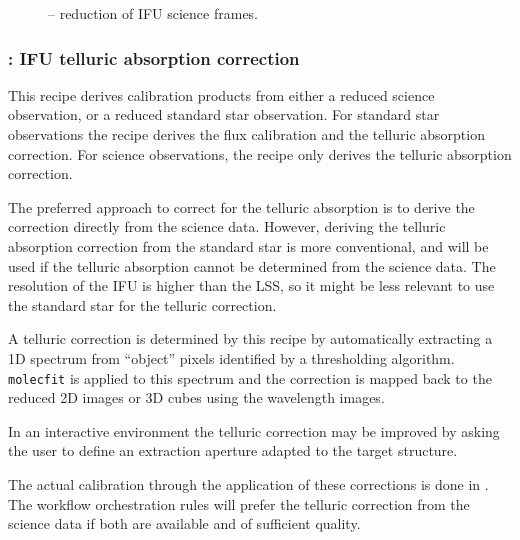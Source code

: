 \begin{figure}[hb]
  \centering
    \def \globalscale {0.700000}
    \fontsize{10}{12}\selectfont
    
  \caption[Recipe: ]{%
     -- reduction of IFU science frames.}
  \label{fig:metis_ifu_reduce}
\end{figure}
\restoregeometry

\clearpage
\subsubsection{: IFU telluric absorption correction}
\label{sssec:ifu_telluric}
\label{rec:metis_ifu_telluric}

This recipe derives calibration products from either a reduced science
observation, or a reduced standard star observation.
For standard star observations the recipe derives the flux calibration and the
telluric absorption correction.
For science observations, the recipe only derives the telluric absorption
correction.

The preferred approach to correct for the telluric absorption is to derive the
correction directly from the science data.
However, deriving the telluric absorption correction from the standard star
is more conventional, and will be used if the telluric absorption cannot be
determined from the science data.
The resolution of the \ac{IFU} is higher than the \ac{LSS}, so it might be less
relevant to use the standard star for the telluric correction.

A telluric correction is determined by this recipe by automatically
extracting a 1D spectrum from ``object'' pixels identified by a
thresholding algorithm. \lstinline{molecfit} is applied to this
spectrum and the correction is mapped back to the reduced 2D images or
3D cubes using the wavelength images.

In an interactive environment the telluric correction may be improved by asking
the user to define an extraction aperture adapted to the target
structure.


The actual calibration through the application of these corrections is done in .
The workflow orchestration rules will prefer the telluric correction from the
science data if both are available and of sufficient quality.

